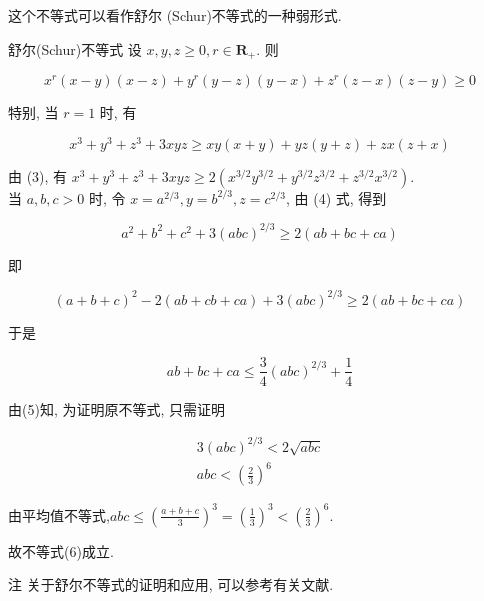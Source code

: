 \begin{note}
	这个不等式可以看作舒尔 (Schur)不等式的一种弱形式.
	
	舒尔(Schur)不等式 设 $x, y, z \geqslant 0, r \in \mathbf{R}_{+}$. 则
	
	$$
	x^{r}(x-y)(x-z)+y^{r}(y-z)(y-x)+z^{r}(z-x)(z-y) \geqslant 0
	$$
	
	特别, 当 $r=1$ 时, 有
	
	
	\begin{equation*}
	x^{3}+y^{3}+z^{3}+3 x y z \geqslant x y(x+y)+y z(y+z)+z x(z+x) \tag{3}
	\end{equation*}
	
	
	由 (3), 有 $x^{3}+y^{3}+z^{3}+3 x y z \geqslant 2\left(x^{3 / 2} y^{3 / 2}+y^{3 / 2} z^{3 / 2}+z^{3 / 2} x^{3 / 2}\right)$.\\
	当 $a, b, c>0$ 时, 令 $x=a^{2 / 3}, y=b^{2 / 3}, z=c^{2 / 3}$, 由 (4) 式, 得到
	
	$$
	a^{2}+b^{2}+c^{2}+3(a b c)^{2 / 3} \geqslant 2(a b+b c+c a)
	$$
	
	即
	
	$$
	(a+b+c)^{2}-2(a b+c b+c a)+3(a b c)^{2 / 3} \geqslant 2(a b+b c+c a)
	$$
	
	于是
	
	
	\begin{equation*}
	a b+b c+c a \leqslant \frac{3}{4}(a b c)^{2 / 3}+\frac{1}{4} \tag{5}
	\end{equation*}
	
	
	由(5)知, 为证明原不等式, 只需证明
	
	
	\begin{gather*}
	3(a b c)^{2 / 3}<2 \sqrt{a b c} \\
	a b c<\left(\frac{2}{3}\right)^{6} \tag{6}
	\end{gather*}
	
	
	由平均值不等式,$a b c \leqslant\left(\frac{a+b+c}{3}\right)^{3}=\left(\frac{1}{3}\right)^{3}<\left(\frac{2}{3}\right)^{6}$.
	
	故不等式(6)成立.
	
	注 关于舒尔不等式的证明和应用, 可以参考有关文献.
\end{note}

